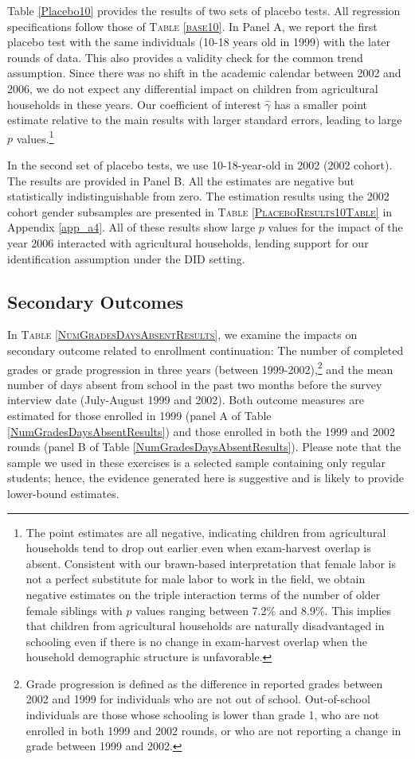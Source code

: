\documentclass[12pt,letterpaper]{article}
\newcommand{\0}{\ensuremath{\mbox{\boldmath $0$}}}
\begin{document}
Table \ref{Placebo10} provides the results of two sets of placebo tests. All regression specifications follow those of \textsc{Table \ref{base10}}.
In Panel A, we report the first placebo test with the same individuals (10-18 years old in 1999) with the later rounds of data. This also provides a validity check for the common trend assumption. Since there was no shift in the academic calendar between 2002 and 2006, we do not expect any differential impact on children from agricultural households in these years. Our coefficient of interest $\hat{\gamma}$ has a smaller point estimate relative to the main results with larger standard errors, leading to large $p$ values.\footnote{The point estimates are all negative, indicating children from agricultural households tend to drop out earlier even when exam-harvest overlap is absent. Consistent with our brawn-based interpretation that female labor is not a perfect substitute for male labor to work in the field, we obtain negative estimates on the triple interaction terms of the number of older female siblings with $p$ values ranging between 7.2\% and 8.9\%. This implies that children from agricultural households are naturally disadvantaged in schooling even if there is no change in exam-harvest overlap when the household demographic structure is unfavorable. }

In the second set of placebo tests, we use 10-18-year-old in 2002 (2002 cohort). The results are provided in Panel B. All the estimates are negative but statistically indistinguishable from zero. The estimation results using the 2002 cohort gender subsamples are presented in \textsc{Table \ref{PlaceboResults10Table}} in Appendix \ref{app_a4}. All of these results show large $p$ values for the impact of the year 2006 interacted with agricultural households, lending support for our identification assumption under the DID setting.


\subsection{Secondary Outcomes}

In \textsc{\small Table \ref{NumGradesDaysAbsentResults}}, we examine the impacts on secondary outcome related to enrollment continuation: The number of completed grades or grade progression in three years (between 1999-2002),\footnote{Grade progression is defined as the difference in reported grades between 2002 and 1999 for individuals who are not out of school. Out-of-school individuals are those whose schooling is lower than grade 1, who are not enrolled in both 1999 and 2002 rounds, or who are not reporting a change in grade between 1999 and 2002.} and the mean number of days absent from school in the past two months before the survey interview date (July-August 1999 and 2002). Both outcome measures are estimated for those enrolled in 1999 (panel A of Table \ref{NumGradesDaysAbsentResults}) and those enrolled in both the 1999 and 2002 rounds (panel B of Table \ref{NumGradesDaysAbsentResults}). Please note that the sample we used in these exercises is a selected sample containing only regular students; hence, the evidence generated here is suggestive and is likely to provide lower-bound estimates.  
\end{document}
